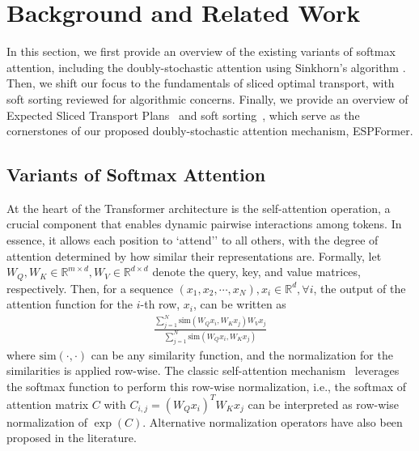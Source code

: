 \section{Background and Related Work}
In this section, we first provide an overview of the existing variants of softmax attention, including the doubly-stochastic attention using Sinkhorn's algorithm \cite{sander2022Sinkformers}. Then, we shift our focus to the fundamentals of sliced optimal transport, with soft sorting reviewed for algorithmic concerns. Finally, we provide an overview of Expected Sliced Transport Plans~\cite{liu2025expected} and soft sorting~\cite{prillo2020softsort}, which serve as the cornerstones of our proposed doubly-stochastic attention mechanism, ESPFormer.




\subsection{Variants of Softmax Attention}
\label{sec:attention}
At the heart of the Transformer architecture is the self-attention operation, a crucial component that enables dynamic pairwise interactions among tokens. In essence, it allows each position to `attend'' to all others, with the degree of attention determined by how similar their representations are. Formally, let $W_Q, W_K\in \mathbb{R}^{m\times d}, W_V\in\mathbb{R}^{d\times d}$ denote the query, key, and value matrices, respectively. Then, for a sequence $(x_1, x_2, \cdots, x_N), x_i \in \mathbb{R}^d, \forall i$, the output of the attention function for the $i$-th row, $x_i$, can be written as
\begin{align}
    \label{eq: generalized normalization}
    \frac{\sum_{j=1}^N\text{sim}(W_Qx_i, W_Kx_j)W_Vx_j}{\sum_{j=1}^N\text{sim}(W_Qx_i, W_Kx_j)}
\end{align}
where $\text{sim}(\cdot, \cdot)$ can be any similarity function, and the normalization for the similarities is applied row-wise. The classic self-attention mechanism~\cite{vaswani2017attention} leverages the softmax function to perform this row-wise normalization, i.e., the softmax of attention matrix $C$ with $C_{i,j}=(W_Qx_i)^TW_Kx_j$ can be interpreted as row-wise normalization of $\exp(C)$. 
Alternative normalization operators have also been proposed in the literature. 
